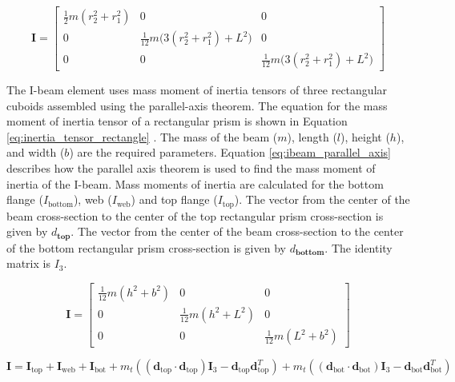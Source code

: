 \documentclass[doublespace,nopageskip]{VTthesis}
\begin{document}
			\begin{equation}
				\mathbf{I} =
				\begin{bmatrix}
					\frac{1}{2} m (r_2^2 + r_1^2) & 0 & 0 \\
					0 & \frac{1}{12} m \big(3 (r_2^2 + r_1^2) + L^2\big) & 0 \\
					0 & 0 & \frac{1}{12} m \big(3 (r_2^2 + r_1^2) + L^2\big)
				\end{bmatrix}
				\label{eq:inertia_tensor_annulus}
			\end{equation}
			
			The I-beam element uses mass moment of inertia tensors of three rectangular cuboids assembled using the parallel-axis theorem. The equation for the mass moment of inertia tensor of a rectangular prism is shown in Equation \ref{eq:inertia_tensor_rectangle} \cite{MassMoment}.  The mass of the beam ($m$), length ($l$), height ($h$), and width ($b$) are the required parameters. Equation \ref{eq:ibeam_parallel_axis} describes how the parallel axis theorem is used to find the mass moment of inertia of the I-beam. Mass moments of inertia are calculated for the bottom flange ($I_\text{bottom}$), web ($I_\text{web}$) and top flange ($I_\text{top}$). The vector from the center of the beam cross-section to the center of the top rectangular prism cross-section is given by $d_\textbf{top}$. The vector from the center of the beam cross-section to the center of the bottom rectangular prism cross-section is given by $d_\textbf{bottom}$. The identity matrix is $I_3$.
			
			
			\begin{equation}
				\mathbf{I} =
				\begin{bmatrix}
					\frac{1}{12} m (h^2 + b^2) & 0 & 0 \\
					0 & \frac{1}{12} m (h^2 + L^2) & 0 \\
					0 & 0 & \frac{1}{12} m (L^2 + b^2)
				\end{bmatrix}
				\label{eq:inertia_tensor_rectangle}
			\end{equation}
			
			\begin{equation}
				\mathbf{I}
				=
				\mathbf{I}_{\text{top}}
				+
				\mathbf{I}_{\text{web}}
				+
				\mathbf{I}_{\text{bot}}
				+
				m_t \left( (\mathbf{d}_{\text{top}} \cdot \mathbf{d}_{\text{top}})\mathbf{I}_3
				- \mathbf{d}_{\text{top}}\mathbf{d}_{\text{top}}^T \right)
				+
				m_t \left( (\mathbf{d}_{\text{bot}} \cdot \mathbf{d}_{\text{bot}})\mathbf{I}_3
				- \mathbf{d}_{\text{bot}}\mathbf{d}_{\text{bot}}^T \right)
				\label{eq:ibeam_parallel_axis}
			\end{equation}
			
\end{document}
